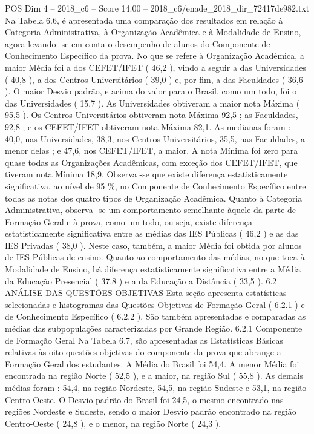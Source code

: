 \begin{textsample}{POS Dim 4 – 2018\_c6 – Score 14.00 – 2018\_c6/enade\_2018\_dir\_72417de982.txt}
Na Tabela 6.6, é apresentada uma comparação dos resultados em relação à Categoria Administrativa, à Organização Acadêmica e à Modalidade de Ensino, agora levando -se em conta o desempenho de alunos do Componente de Conhecimento Específico da prova.
No que se refere à Organização Acadêmica, a maior Média foi a dos CEFET/IFET ( 46,2 ), vindo a seguir a das Universidades ( 40,8 ), a dos Centros Universitários ( 39,0 ) e, por fim, a das Faculdades ( 36,6 ).
O maior Desvio padrão, e acima do valor para o Brasil, como um todo, foi o das Universidades ( 15,7 ).
As Universidades obtiveram a maior nota Máxima ( 95,5 ).
Os Centros Universitários obtiveram nota Máxima 92,5 ; as Faculdades, 92,8 ; e os CEFET/IFET obtiveram nota Máxima 82,1.
As medianas foram : 40,0, nas Universidades, 38,3, nos Centros Universitários, 35,5, nas Faculdades, a menor delas ; e 47,6, nos CEFET/IFET, a maior.
A nota Mínima foi zero para quase todas as Organizações Acadêmicas, com exceção dos CEFET/IFET, que tiveram nota Mínima 18,9.
Observa -se que existe diferença estatisticamente significativa, ao nível de 95 \%, no Componente de Conhecimento Específico entre todas as notas dos quatro tipos de Organização Acadêmica.
Quanto à Categoria Administrativa, observa -se um comportamento semelhante àquele da parte de Formação Geral e à prova, como um todo, ou seja, existe diferença estatisticamente significativa entre as médias das IES Públicas ( 46,2 ) e as das IES Privadas ( 38,0 ).
Neste caso, também, a maior Média foi obtida por alunos de IES Públicas de ensino.
Quanto ao comportamento das médias, no que toca à Modalidade de Ensino, há diferença estatisticamente significativa entre a Média da Educação Presencial ( 37,8 ) e a da Educação a Distância ( 33,5 ). 6.2 ANÁLISE DAS QUESTÕES OBJETIVAS Esta seção apresenta estatísticas selecionadas e histogramas das Questões Objetivas de Formação Geral ( 6.2.1 ) e de Conhecimento Específico ( 6.2.2 ).
São também apresentadas e comparadas as médias das subpopulações caracterizadas por Grande Região. 6.2.1 Componente de Formação Geral Na Tabela 6.7, são apresentadas as Estatísticas Básicas relativas às oito questões objetivas do componente da prova que abrange a Formação Geral dos estudantes.
A Média do Brasil foi 54,4.
A menor Média foi encontrada na região Norte ( 52,5 ), e a maior, na região Sul ( 55,8 ).
As demais médias foram : 54,4, na região Nordeste, 54,5, na região Sudeste e 53,1, na região Centro-Oeste.
O Desvio padrão do Brasil foi 24,5, o mesmo encontrado nas regiões Nordeste e Sudeste, sendo o maior Desvio padrão encontrado na região Centro-Oeste ( 24,8 ), e o menor, na região Norte ( 24,3 ).

\end{textsample}
